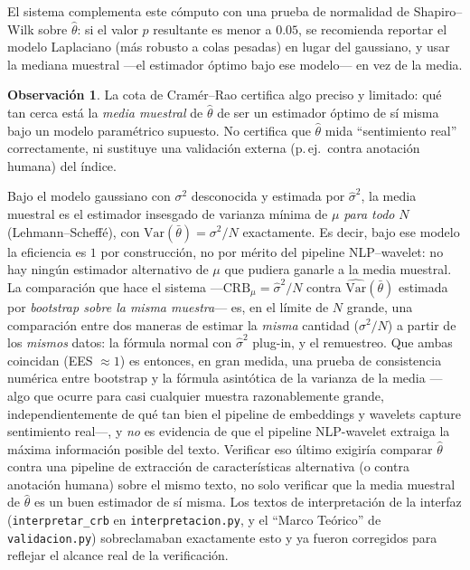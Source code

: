 \documentclass[11pt,a4paper,oneside]{article}
\theoremstyle{definition}
\newtheorem{remark}[definition]{Observación}
\begin{document}
El sistema complementa este cómputo con una prueba de normalidad de Shapiro--Wilk sobre
$\hat\theta$: si el valor $p$ resultante es menor a $0.05$, se recomienda reportar el modelo
Laplaciano (más robusto a colas pesadas) en lugar del gaussiano, y usar la mediana muestral
—el estimador óptimo bajo ese modelo— en vez de la media.

\begin{remark}
La cota de Cramér--Rao certifica algo preciso y limitado: qué tan cerca está la \emph{media
muestral} de $\hat\theta$ de ser un estimador óptimo de sí misma bajo un modelo paramétrico
supuesto. No certifica que $\hat\theta$ mida ``sentimiento real'' correctamente, ni sustituye
una validación externa (p.\,ej.\ contra anotación humana) del índice.
\end{remark}

\begin{warningBox}[title=Hueco: qué NO certifica esta verificación]
Bajo el modelo gaussiano con $\sigma^2$ desconocida y estimada por $\hat\sigma^2$, la media
muestral es el estimador insesgado de varianza mínima de $\mu$ \emph{para todo} $N$ (Lehmann--Scheffé),
con $\mathrm{Var}(\bar\theta)=\sigma^2/N$ exactamente. Es decir, bajo ese modelo la eficiencia es
$1$ por construcción, no por mérito del pipeline NLP--wavelet: no hay ningún estimador
alternativo de $\mu$ que pudiera ganarle a la media muestral. La comparación que hace el sistema
—$\mathrm{CRB}_\mu=\hat\sigma^2/N$ contra $\widehat{\mathrm{Var}}(\bar\theta)$ estimada por
\emph{bootstrap sobre la misma muestra}— es, en el límite de $N$ grande, una comparación entre
dos maneras de estimar la \emph{misma} cantidad ($\sigma^2/N$) a partir de los \emph{mismos}
datos: la fórmula normal con $\hat\sigma^2$ plug-in, y el remuestreo. Que ambas coincidan (EES
$\approx 1$) es entonces, en gran medida, una prueba de consistencia numérica entre bootstrap y
la fórmula asintótica de la varianza de la media —algo que ocurre para casi cualquier muestra
razonablemente grande, independientemente de qué tan bien el pipeline de embeddings y wavelets
capture sentimiento real—, y \emph{no} es evidencia de que el pipeline NLP-wavelet extraiga la
máxima información posible del texto. Verificar eso último exigiría comparar $\hat\theta$ contra
una pipeline de extracción de características alternativa (o contra anotación humana) sobre el
mismo texto, no solo verificar que la media muestral de $\hat\theta$ es un buen estimador de sí
misma. Los textos de interpretación de la interfaz (\texttt{interpretar\_crb} en
\texttt{interpretacion.py}, y el ``Marco Teórico'' de \texttt{validacion.py}) sobreclamaban
exactamente esto y ya fueron corregidos para reflejar el alcance real de la verificación.
\end{warningBox}
\end{document}
